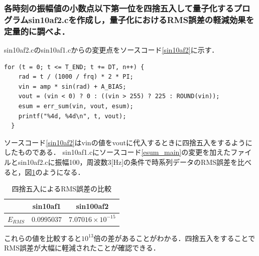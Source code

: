 \documentclass[titlepage]{jarticle}
\begin{document}
\subsubsection{各時刻の振幅値の小数点以下第一位を四捨五入して量子化するプログラムsin10af2.cを作成し，量子化におけるRMS誤差の軽減効果を定量的に調べよ．}
sin10af2.cのsin10af1.cからの変更点をソースコード\ref{sin10af2}に示す．
\begin{lstlisting}[caption=sin10af2.c,label=sin10af2]
  for (t = 0; t <= T_END; t += DT, n++) {
    rad = t / (1000 / frq) * 2 * PI;
    vin = amp * sin(rad) + A_BIAS;
    vout = (vin < 0) ? 0 : ((vin > 255) ? 225 : ROUND(vin));
    esum = err_sum(vin, vout, esum);
    printf("%4d, %4d\n", t, vout);
  }
\end{lstlisting}
ソースコード\ref{sin10af2}はvinの値をvoutに代入するときに四捨五入をするようにしたものである．
sin10af1.cにソースコード\ref{esum_main}の変更を加えたファイルとsin10af2.cに振幅100，周波数3[Hz]の条件で時系列データのRMS誤差を比べると，図\ref{esum}のようになる．
\begin{table}[H]
  \caption{四捨五入によるRMS誤差の比較}
  \label{esum}
  \centering
  \begin{tabular}{c|cc}\hline
              & sin10af1    & sin100af2               \\\hline\hline
    $E_{RMS}$ & $0.0995037$ & $7.07016\times10^{-15}$ \\\hline
  \end{tabular}
\end{table}
これらの値を比較すると$10^{13}$倍の差があることがわかる．四捨五入をすることでRMS誤差が大幅に軽減されたことが確認できる．

\setcounter{subsubsection}{5}
\end{document}
